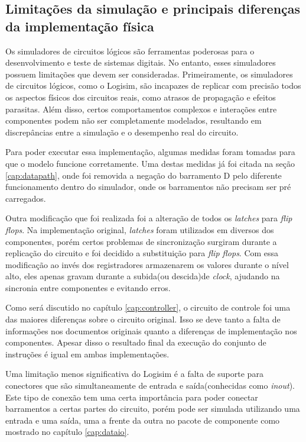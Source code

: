 \documentclass[
	article,			%
	11pt,				%
	oneside,			%
	a4paper,			%
	english,			%
	brazil,				%
	sumario=tradicional
	]{abntex2}
\begin{document}
\subsection{Limitações da simulação e principais diferenças da implementação física}\label{cap:limitations}
Os simuladores de circuitos lógicos são ferramentas poderosas para o desenvolvimento e teste de sistemas digitais. No entanto, esses simuladores possuem limitações que devem ser consideradas. Primeiramente, os simuladores de circuitos lógicos, como o Logisim, são incapazes de replicar com precisão todos os aspectos físicos dos circuitos reais, como atrasos de propagação e efeitos parasitas. Além disso, certos comportamentos complexos e interações entre componentes podem não ser completamente modelados, resultando em discrepâncias entre a simulação e o desempenho real do circuito.

Para poder executar essa implementação, algumas medidas foram tomadas para que o modelo funcione corretamente. Uma destas medidas já foi citada na seção \ref{cap:datapath}, onde foi removida a negação do barramento D pelo diferente funcionamento dentro do simulador, onde os barramentos não precisam ser pré carregados. 

Outra modificação que foi realizada foi a alteração de todos os \textit{latches} para \textit{flip flops}. Na implementação original, \textit{latches} foram utilizados em diversos dos componentes, porém certos problemas de sincronização surgiram durante a replicação do circuito e foi decidido a substituição para \textit{flip flops}. Com essa modificação ao invés dos registradores armazenarem os valores durante o nível alto, eles apenas gravam durante a subida(ou descida)de \textit{clock}, ajudando na sincronia entre componentes e evitando erros.

Como será discutido no capítulo \ref{cap:controller}, o circuito de controle foi uma das maiores diferenças sobre o circuito original. Isso se deve tanto a falta de informações nos documentos originais quanto a diferenças de implementação nos componentes. Apesar disso o resultado final da execução do conjunto de instruções é igual em ambas implementações.

Uma limitação menos significativa do Logisim é a falta de suporte para conectores que são simultaneamente de entrada e saída(conhecidas como \textit{inout}). Este tipo de conexão tem uma certa importância para poder conectar barramentos a certas partes do circuito, porém pode ser simulada utilizando uma entrada e uma saída, uma a frente da outra no pacote de componente como mostrado no capítulo \ref{cap:dataio}.
\end{document}
